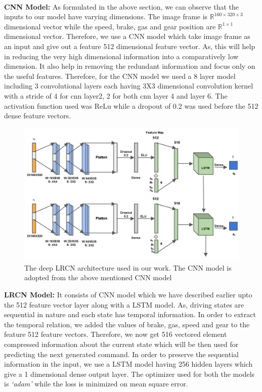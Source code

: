 \documentclass[a4paper,11pt,titlepage,drop]{article}%
\begin{document}
\paragraph{}

\textbf{CNN Model:} As formulated in the above section, we can observe that the inputs to our model have varying dimensions. The image frame is $\mathbb{R}^{160\times320\times3}$ dimensional vector while the speed, brake, gas and gear position are $\mathbb{R}^{1\times1}$ dimensional vector. Therefore, we use a CNN model which take image frame as an input and give out a feature 512 dimensional feature vector. As, this will help in reducing the very high dimensional information into a comparatively low dimension. It also help in removing the redundant information and focus only on the useful features. Therefore, for the CNN model we used a 8 layer model including 3 convolutional layers each having 3X3 dimensional convolution kernel with a stride of 4 for cnn layer2, 2 for both cnn layer 4 and layer 6. The activation function used was ReLu while a dropout of 0.2 was used before the 512 dense feature vectors. \\


\begin{figure}[ht]
    \center
    \includegraphics[width=\textwidth]{lrcn}
    \caption{The deep LRCN architecture used in our work. The CNN model is adopted from the above mentioned CNN model}
    \label{fig:figure1}
\end{figure}

\textbf{LRCN Model:} It consists of CNN model which we have described earlier upto the 512 feature vector layer along with a LSTM model. As, driving states are sequential in nature and each state has temporal information. In order to extract the temporal relation, we added the values of brake, gas, speed and gear to the feature 512 feature vectors. Therefore, we now get 516 vectored element compressed information about the current state which will be then used for predicting the next generated command. In order to preserve the sequential information in the input, we use a LSTM model having 256 hidden layers which give a 1 dimensional dense output layer. The optimizer used for both the models is \emph{`adam'} while the loss is minimized on mean square error. \\
\end{document}
